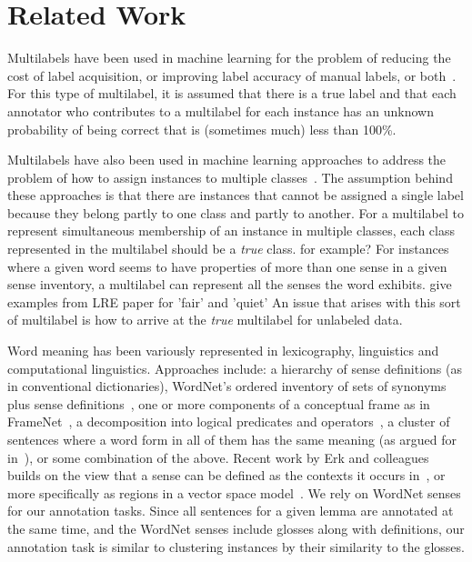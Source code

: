\documentclass[11pt]{article}
\begin{document}
\section{Related Work} %

Multilabels have been used in machine learning for the problem of
reducing the cost of label acquisition, or improving label accuracy of
manual labels, or both~\cite{snowEtAl08,shengEtAl_2008}. For this type
of multilabel, it is assumed that there is a true label and that each
annotator who contributes to a multilabel for each instance has an
unknown probability of being correct that is (sometimes much) less
than 100\%.

Multilabels have also been used in machine learning approaches to
address the problem of how to assign instances to multiple
classes~\cite{tsoumakas&katakis_2007,boutellEtAl_2004,mccallum_1999}.
The assumption behind these approaches is that there are instances
that cannot be assigned a single label because they belong partly to
one class and partly to another. For a multilabel to represent
simultaneous membership of an instance in multiple classes, each class
represented in the multilabel should be a {\it true} class. {for
example?} For instances where a given word seems to have properties of
more than one sense in a given sense inventory, a multilabel can
represent all the senses the word exhibits. {give examples from LRE
paper for 'fair' and 'quiet'} An issue that arises with this sort of
multilabel is how to arrive at the {\it true} multilabel for unlabeled
data.

Word meaning has been variously represented in lexicography,
linguistics and computational linguistics. Approaches include: a
hierarchy of sense definitions (as in conventional dictionaries),
WordNet's ordered inventory of sets of synonyms plus sense
definitions~\cite{millerEtAl93}, one or more components of a
conceptual frame as in FrameNet~\cite{fillmoreEtAl03}, a decomposition
into logical predicates and operators~\cite{dowty79}, a cluster of
sentences where a word form in all of them has the same meaning (as
argued for in~\cite{kilgarriff97}), or some combination of the above.
Recent work by Erk and colleagues builds on the view that a sense can
be defined as the contexts it occurs in~\cite{kilgarriff97}, or more
specifically as regions in a vector space model~\cite{erk09}. We rely
on WordNet senses for our annotation tasks. Since all sentences for a
given lemma are annotated at the same time, and the WordNet senses
include glosses along with definitions, our annotation task is similar
to clustering instances by their similarity to the glosses.
\end{document}
